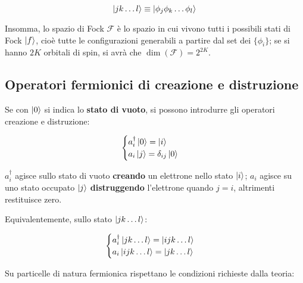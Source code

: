 \begin{equation}\label{eqn:notazione-ket}
    \ket{j k \dots l} \equiv \ket{\phi_j \phi_k \dots \phi_l}
\end{equation}

Insomma, lo spazio di Fock $\mathcal{F}$ è lo spazio in cui vivono tutti i possibili stati di Fock $\ket{f}$, cioè tutte le configurazioni generabili a partire dal set dei $\{\phi_i\}$; se si hanno $2K$ orbitali di spin, si avrà che $\dim{(\mathcal{F})} = 2^{2K}$.

\subsection{Operatori fermionici di creazione e distruzione}

Se con $\ket{0}$ si indica lo \textbf{stato di vuoto}, si possono introdurre gli operatori creazione e distruzione:

\begin{equation}\label{eqn:creazione-distruzione}
\begin{cases}
    a^{\dagger}_{i} \ket{0} = \ket{i}\\
    a_i \ket{j} = \delta_{i j}\ket{0}
\end{cases}
\end{equation}

$a^{\dagger}_{i}$ agisce sullo stato di vuoto \textbf{creando} un elettrone nello stato $\ket{i}$; $a_i$ agisce su uno stato occupato $\ket{j}$ \textbf{distruggendo} l'elettrone quando $j=i$, altrimenti restituisce zero.

Equivalentemente, sullo stato $\ket{j k \dots l}$:

\begin{equation}
\begin{cases}
    a^{\dagger}_{i} \ket{j k \dots l} = \ket{i j k \dots l}\\
    a_i \ket{i j k \dots l} = \ket{j k \dots l}
\end{cases}
\end{equation}

Su particelle di natura fermionica rispettano le condizioni richieste dalla teoria:

